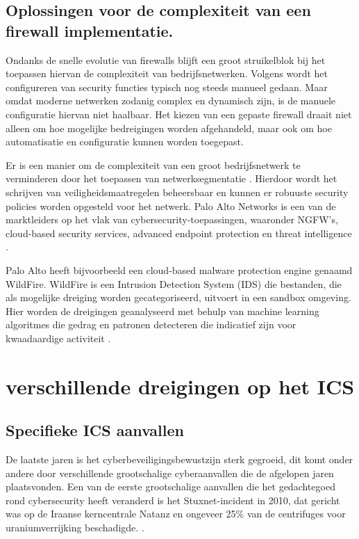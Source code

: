 \subsection{Oplossingen voor de complexiteit van een firewall implementatie.}

Ondanks de snelle evolutie van firewalls blijft een groot struikelblok bij het toepassen hiervan de complexiteit van bedrijfsnetwerken. Volgens \textcite{Bringhenti2023} wordt het configureren van security functies typisch nog steeds manueel gedaan. Maar omdat moderne netwerken zodanig complex en dynamisch zijn, is de manuele configuratie hiervan niet haalbaar. Het kiezen van een gepaste firewall draait niet alleen om hoe mogelijke bedreigingen worden afgehandeld, maar ook om hoe automatisatie en configuratie kunnen worden toegepast.

Er is een manier om de complexiteit van een groot bedrijfsnetwerk te verminderen door het toepassen van netwerksegmentatie \autocite{Bringhenti2023}. Hierdoor wordt het schrijven van veiligheidsmaatregelen beheersbaar en kunnen er robuuste security policies worden opgesteld voor het netwerk. Palo Alto Networks is een van de marktleiders op het vlak van cybersecurity-toepassingen, waaronder NGFW’s, cloud-based security services, advanced endpoint protection en threat intelligence \autocite{TechnicalWhitepaper2014}.

Palo Alto heeft bijvoorbeeld een cloud-based malware protection engine genaamd WildFire. WildFire is een Intrusion Detection System (IDS) die bestanden, die als mogelijke dreiging worden gecategoriseerd, uitvoert in een sandbox omgeving. Hier worden de dreigingen geanalyseerd met behulp van machine learning algoritmes die gedrag en patronen detecteren die indicatief zijn voor kwaadaardige activiteit \autocite{PaloAltoWF2024}.




\section{verschillende dreigingen op het ICS}

\subsection{Specifieke ICS aanvallen}

De laatste jaren is het cyberbeveiligingsbewustzijn sterk gegroeid, dit komt onder andere door verschillende grootschalige cyberaanvallen die de afgelopen jaren plaatsvonden. Een van de eerste grootschalige aanvallen die het gedachtegoed rond cybersecurity heeft veranderd is het Stuxnet-incident in 2010, dat gericht was op de Iraanse kerncentrale Natanz en ongeveer 25\% van de centrifuges voor uraniumverrijking beschadigde. \autocite{Zetter2014}. 

